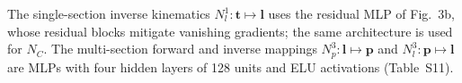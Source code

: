 The single-section inverse kinematics $N_l^1: \mathbf{t} \mapsto \mathbf{l}$ uses the residual MLP of Fig.~3b, whose residual blocks mitigate vanishing gradients; the same architecture is used for $N_C$. The multi-section forward and inverse mappings $N_p^3: \mathbf{l} \mapsto \mathbf{p}$ and $N_l^3: \mathbf{p} \mapsto \mathbf{l}$ are MLPs with four hidden layers of 128 units and ELU activations (Table~S11).
